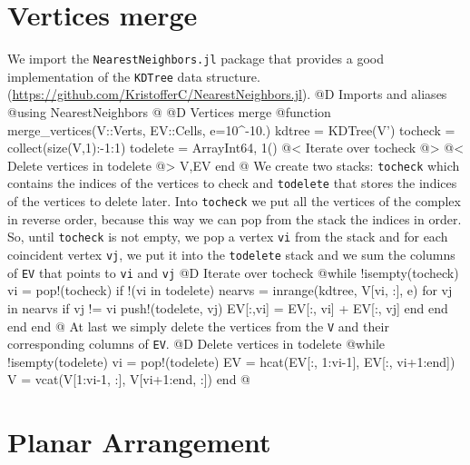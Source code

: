 \documentclass[10pt,oneside]{article}
\begin{document}
\section{Vertices merge}
We import the \texttt{NearestNeighbors.jl} package that provides a good implementation of
the \texttt{KDTree} data structure. 
(\url{https://github.com/KristofferC/NearestNeighbors.jl}).
@D Imports and aliases
@{using NearestNeighbors
@}
@D Vertices merge
@{function merge_vertices(V::Verts, EV::Cells, e=10^-10.)
    kdtree = KDTree(V')
    tocheck = collect(size(V,1):-1:1)
    todelete = Array{Int64, 1}()
    @< Iterate over tocheck @>
    @< Delete vertices in todelete @>
    V,EV
end
@}
We create two stacks: \texttt{tocheck} which contains the indices of the vertices
to check and \texttt{todelete} that stores the indices of the vertices to delete later.
Into \texttt{tocheck} we put all the vertices of the complex in reverse order, because
this way we can pop from the stack the indices in order. So, until \texttt{tocheck} is not empty,
we pop a vertex \texttt{vi} from the stack and for each coincident vertex \texttt{vj}, we put it 
into the \texttt{todelete} stack and we sum the columns of \texttt{EV} that points to \texttt{vi} and \texttt{vj}
@D Iterate over tocheck 
@{while !isempty(tocheck)
    vi = pop!(tocheck)
    if !(vi in todelete)
        nearvs = inrange(kdtree, V[vi, :], e)
        for vj in nearvs
            if vj != vi
                push!(todelete, vj)
                EV[:,vi] = EV[:, vi] + EV[:, vj]
            end
        end
    end
end
@}
At last we simply delete the vertices from the \texttt{V} and their 
corresponding columns of \texttt{EV}.
@D Delete vertices in todelete
@{while !isempty(todelete)
    vi = pop!(todelete)
    EV = hcat(EV[:, 1:vi-1], EV[:, vi+1:end])
    V = vcat(V[1:vi-1, :], V[vi+1:end, :])
end
@}


\section{Planar Arrangement}
\end{document}
